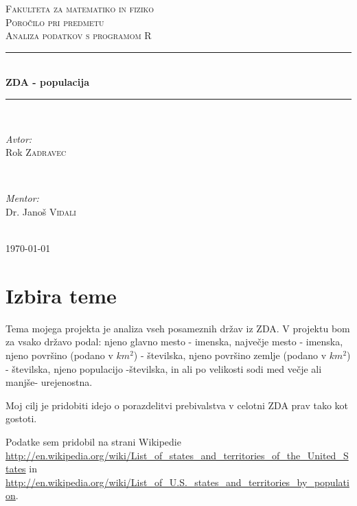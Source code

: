 \documentclass[11pt,a4paper]{article}
\begin{document}
\begin{titlepage}
\newcommand{\HRule}{\rule{\linewidth}{0.5mm}}
\center

\textsc{\LARGE Fakulteta za matematiko in fiziko}\\[3 cm]
\textsc{\Large Poročilo pri predmetu}\\[0.5cm]
\textsc{\large Analiza podatkov s programom R}\\[2 cm]
\HRule \\[0.4cm]
{ \huge \bfseries ZDA - populacija}\\[0.4cm] 
\HRule \\[6 cm]


\begin{minipage}{0.4\textwidth}
\begin{flushleft} \large
\emph{Avtor:}\\
Rok \textsc{Zadravec}
\end{flushleft}
\end{minipage}
~
\begin{minipage}{0.4\textwidth}
\begin{flushright} \large
\emph{Mentor:} \\
Dr. Janoš \textsc{Vidali}
\end{flushright}
\end{minipage}\\[2 cm]

{\large \today}\\[3cm] 


\end{titlepage}

\section{Izbira teme}

Tema mojega projekta je analiza vseh posameznih držav iz ZDA. V projektu bom za vsako državo podal: njeno glavno mesto - imenska, največje mesto - imenska, njeno površino (podano v $km^2$) - številska, njeno površino zemlje (podano v $km^2$) - številska, njeno populacijo -številska, in ali po velikosti sodi med večje ali manjše- urejenostna.

Moj cilj je pridobiti idejo o porazdelitvi prebivalstva v celotni ZDA prav tako kot gostoti.

Podatke sem pridobil na strani Wikipedie \url{http://en.wikipedia.org/wiki/List_of_states_and_territories_of_the_United_States} in \url{http://en.wikipedia.org/wiki/List_of_U.S._states_and_territories_by_population}.
\end{document}
